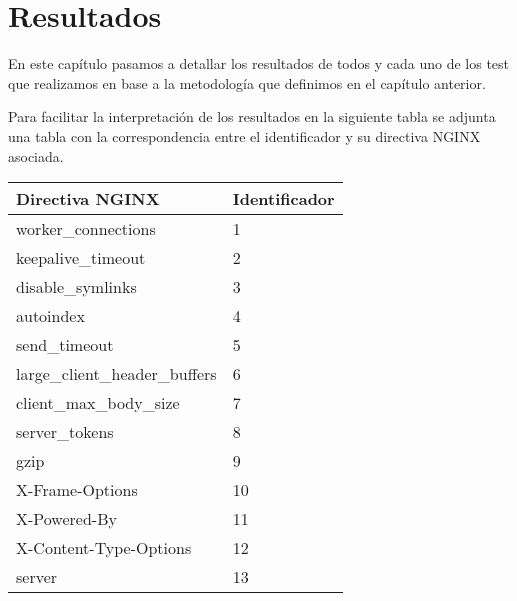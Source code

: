 \chapter{Resultados}

En este capítulo pasamos a detallar los resultados de todos y cada uno de los test que realizamos en base a la metodología que definimos en el capítulo anterior.

\bigskip
Para facilitar la interpretación de los resultados en la siguiente tabla se adjunta una tabla con la correspondencia entre el identificador y su directiva NGINX asociada.

\begin{table}[H]
\begin{tabular}{|l|l|}
\hline
\textbf{Directiva NGINX}       & \textbf{Identificador} \\ \hline
worker\_connections            & 1                      \\ \hline
keepalive\_timeout             & 2                      \\ \hline
disable\_symlinks              & 3                      \\ \hline
autoindex                      & 4                      \\ \hline
send\_timeout                  & 5                      \\ \hline
large\_client\_header\_buffers & 6                      \\ \hline
client\_max\_body\_size        & 7                      \\ \hline
server\_tokens                 & 8                      \\ \hline
gzip                           & 9                      \\ \hline
X-Frame-Options                & 10                     \\ \hline
X-Powered-By                   & 11                     \\ \hline
X-Content-Type-Options         & 12                     \\ \hline
server                         & 13                     \\ \hline
\end{tabular}
\end{table}


